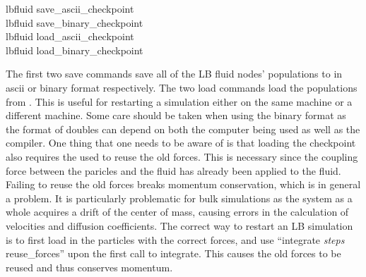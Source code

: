 \begin{essyntax}
  lbfluid save_ascii_checkpoint \\
  lbfluid save_binary_checkpoint \\
  lbfluid load_ascii_checkpoint \\
  lbfluid load_binary_checkpoint 
\end{essyntax}
The first two save commands save all of the LB fluid nodes' populations to
 in ascii or binary format respectively.  The two load commands
load the populations from .  This is  useful for restarting a
simulation either on the same machine or a different machine.  Some care should
be taken when using the binary format as the format of doubles can depend
on both the computer being used as well as the compiler. One thing that one
needs to be aware of is that loading the checkpoint also requires the used to
reuse the old forces. This is necessary since the coupling force between the
paricles and the fluid has already been applied to the fluid. Failing to reuse
the old forces breaks momentum conservation, which is in general a problem. It
is particularly problematic for bulk simulations as the system as a whole
acquires a drift of the center of mass, causing errors in the calculation of
velocities and diffusion coefficients.  The correct way to restart
an LB simulation is to first load in the particles with the correct forces, and
use ``integrate \textit{steps} reuse_forces'' upon the first call to integrate.
This causes the old forces to be reused and thus conserves momentum.

